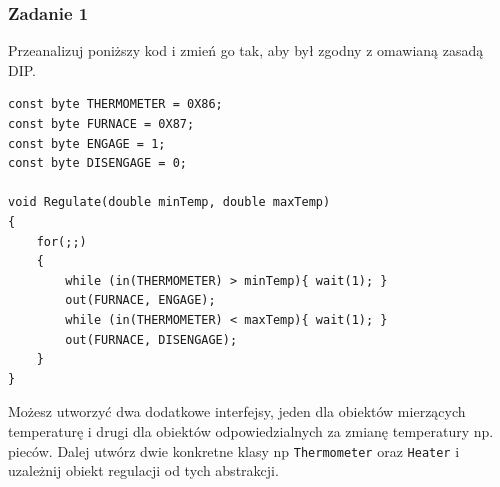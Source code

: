 \subsubsection{Zadanie 1}
Przeanalizuj poniższy kod i zmień go tak, aby był zgodny z omawianą zasadą DIP.
\begin{lstlisting}
const byte THERMOMETER = 0X86;
const byte FURNACE = 0X87;
const byte ENGAGE = 1;
const byte DISENGAGE = 0;

void Regulate(double minTemp, double maxTemp)
{
	for(;;)
	{
		while (in(THERMOMETER) > minTemp){ wait(1); }
		out(FURNACE, ENGAGE);
		while (in(THERMOMETER) < maxTemp){ wait(1); }
		out(FURNACE, DISENGAGE);	
	}
}
\end{lstlisting}

Możesz utworzyć dwa dodatkowe interfejsy, jeden dla obiektów mierzących temperaturę i drugi dla obiektów odpowiedzialnych za zmianę temperatury np. pieców. Dalej utwórz dwie konkretne klasy np \texttt{Thermometer} oraz \texttt{Heater} i uzależnij obiekt regulacji od tych abstrakcji. 